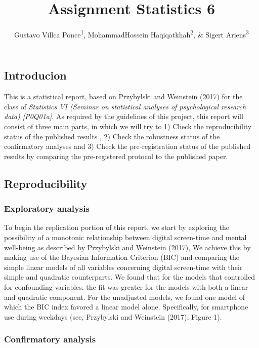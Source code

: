 \documentclass[man]{apa6}
\title{Assignment Statistics 6}
\author{Gustavo Villca Ponce\textsuperscript{1}, MohammadHossein Haqiqatkhah\textsuperscript{2}, \& Sigert Ariens\textsuperscript{3}}
\affiliation{
    \vspace{0.5cm}
          \textsuperscript{1} r0292033\\
          \textsuperscript{2} r0607671\\
          \textsuperscript{3} r0446864\\
          \textsuperscript{} Faculty of Psychology and Educational Sciences, KU Leuven.  }
\theoremstyle{definition}
\theoremstyle{definition}
\theoremstyle{definition}
\theoremstyle{remark}
\begin{document}
\maketitle

\setcounter{secnumdepth}{0}



\hypertarget{introducion}{%
\subsection{Introducion}\label{introducion}}

This is a statistical report, based on Przybylski and Weinstein (2017)
for the class of \emph{Statistics VI (Seminar on statistical analyses of
psychological research data) {[}P0Q01a{]}}. As required by the
guidelines of this project, this report will consist of three main
parts, in which we will try to 1) Check the reproducibility status of
the published results , 2) Check the robustness status of the
confirmatory analyses and 3) Check the pre-registration status of the
published results by comparing the pre-registered protocol to the
published paper.

\hypertarget{reproducibility}{%
\subsection{Reproducibility}\label{reproducibility}}

\hypertarget{exploratory-analysis}{%
\subsubsection{Exploratory analysis}\label{exploratory-analysis}}

To begin the replication portion of this report, we start by exploring
the possibility of a monotonic relationship between digital screen-time
and mental well-being as described by Przybylski and Weinstein (2017),
We achieve this by making use of the Bayesian Information Criterion
(BIC) and comparing the simple linear models of all variables concerning
digital screen-time with their simple and quadratic counterparts. We
found that for the models that controlled for confounding variables, the
fit was greater for the models with both a linear and quadratic
component. For the unadjusted models, we found one model of which the
BIC index favored a linear model alone. Specifically, for smartphone use
during weekdays (see, Przybylski and Weinstein (2017), Figure 1).

\hypertarget{confirmatory-analysis}{%
\subsubsection{Confirmatory analysis}\label{confirmatory-analysis}}
\end{document}
